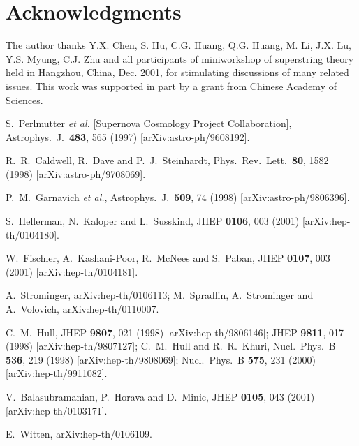 \documentclass[a4paper,12pt]{article}
\begin{document}
 

\section*{Acknowledgments}
The author thanks Y.X. Chen, S. Hu, C.G. Huang, Q.G. Huang, M. Li, J.X. Lu,
 Y.S. Myung, C.J. Zhu and all participants of miniworkshop of superstring theory held 
in Hangzhou, China, Dec. 2001, for stimulating 
discussions of many related issues. This work was supported in part by a grant from Chinese 
Academy of Sciences. 


\begin{thebibliography}{99}
S.~Perlmutter {\it et al.}  [Supernova Cosmology Project Collaboration],
Astrophys.\ J.\  {\bf 483}, 565 (1997)
[arXiv:astro-ph/9608192].
 
R.~R.~Caldwell, R.~Dave and P.~J.~Steinhardt,
Phys.\ Rev.\ Lett.\  {\bf 80}, 1582 (1998)
[arXiv:astro-ph/9708069].
 
P.~M.~Garnavich {\it et al.},
Astrophys.\ J.\  {\bf 509}, 74 (1998)
[arXiv:astro-ph/9806396].

S.~Hellerman, N.~Kaloper and L.~Susskind,
JHEP {\bf 0106}, 003 (2001)
[arXiv:hep-th/0104180].
 
W.~Fischler, A.~Kashani-Poor, R.~McNees and S.~Paban,
JHEP {\bf 0107}, 003 (2001)
[arXiv:hep-th/0104181].

A.~Strominger,
arXiv:hep-th/0106113;
M.~Spradlin, A.~Strominger and A.~Volovich,
arXiv:hep-th/0110007.

C.~M.~Hull,
JHEP {\bf 9807}, 021 (1998)
[arXiv:hep-th/9806146];
JHEP {\bf 9811}, 017 (1998)
[arXiv:hep-th/9807127]; 
C.~M.~Hull and R.~R.~Khuri,
Nucl.\ Phys.\ B {\bf 536}, 219 (1998)
[arXiv:hep-th/9808069];
Nucl.\ Phys.\ B {\bf 575}, 231 (2000)
[arXiv:hep-th/9911082].
 

V.~Balasubramanian, P.~Horava and D.~Minic,
JHEP {\bf 0105}, 043 (2001)
[arXiv:hep-th/0103171].

E.~Witten,
arXiv:hep-th/0106109.
 

\end{thebibliography}
\end{document}
